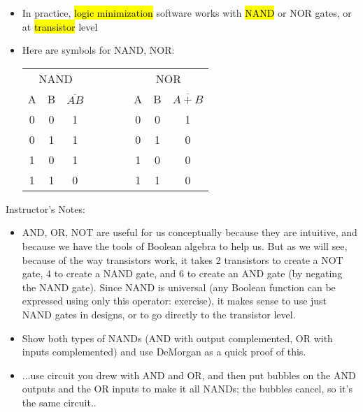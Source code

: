 \begin{frame}[fragile]
  \begin{itemize}
  \item In practice, \hl{logic minimization} software works with
	\hl{NAND} or NOR gates, or at \hl{transistor} level

  \item Here are symbols for NAND, NOR:

	\begin{center}
	\begin{tabular}{|c|c|c|c|c|c|c|}\cline{1-3}\cline{5-7}
	\multicolumn{3}{|c|}{NAND}& &\multicolumn{3}{|c|}{NOR} \\\cline{1-3}\cline{5-7}
	A & B & \small$\overline{AB}$ &~~~~~ & A & B & \small$\overline{A+B}$  \\\cline{1-3}\cline{5-7}
	0 & 0 & 1   & & 0 & 0 & 1   \\\cline{1-3}\cline{5-7}
	0 & 1 & 1   & & 0 & 1 & 0   \\\cline{1-3}\cline{5-7}
	1 & 0 & 1   & & 1 & 0 & 0 \\\cline{1-3}\cline{5-7}
	1 & 1 & 0   & & 1 & 1 & 0 \\\cline{1-3}\cline{5-7}
	\end{tabular}
	\end{center}
    \end{itemize}
\end{frame}
\BNotes\ifnum{}
\begin{frame}[fragile]
Instructor's Notes:
\begin{itemize}
\item
AND, OR, NOT are useful for us conceptually because they are
intuitive, and because we have the tools of Boolean algebra to help
us. But as we will see, because of the way transistors work, it takes 2
transistors to create a NOT gate, 4 to create a NAND gate, and 6 to
create an AND gate (by negating the NAND gate). Since NAND is
universal (any Boolean function can be expressed using only this
operator: exercise), it makes sense to use just NAND gates in designs,
or to go directly to the transistor level.

\item 	Show both types of NANDs (AND with output complemented, OR with
	inputs complemented) and use DeMorgan as a quick proof of this.
\item ...use circuit you drew with AND and OR, and then put bubbles on the
	AND outputs and the OR inputs to make it all NANDs; the bubbles
	cancel, so it's the same circuit..

\end{itemize}
\end{frame}
\fi\ENotes

